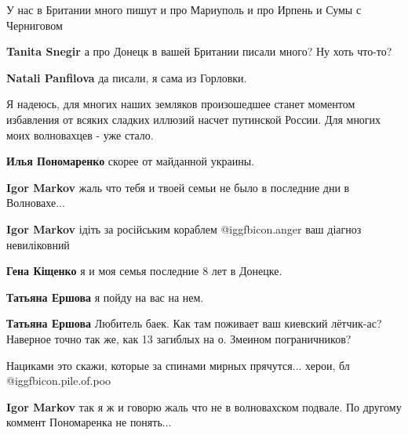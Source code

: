  
 
 
 
 
\zzSecCmt

\begin{itemize} %

У нас в Британии много пишут и про Мариуполь и про Ирпень и Сумы с Черниговом

\begin{itemize} %
\textbf{Tanita Snegir} а про Донецк в вашей Британии писали много? Ну хоть что-то?

\textbf{Natali Panfilova} да писали, я сама из Горловки.
\end{itemize} %


Я надеюсь, для многих наших земляков произошедшее станет моментом избавления от
всяких сладких иллюзий насчет путинской России. Для многих моих волновахцев -
уже стало.

\begin{itemize} %
\textbf{Илья Пономаренко} скорее от майданной украины.

\textbf{Igor Markov} жаль что тебя и твоей семьи не было в последние дни в Волновахе...

\textbf{Igor Markov} ідіть за російським кораблем @igg{fbicon.anger} 
ваш діагноз невиліковний

\textbf{Гена Кіщенко} я и моя семья последние 8 лет в Донецке.

\textbf{Татьяна Ершова} я пойду на вас на нем.

\textbf{Татьяна Ершова} Любитель баек. Как там поживает ваш киевский лётчик-ас? Наверное точно так же, как 13 загиблых на о. Змеином пограничников?

Нациками это скажи, которые за спинами мирных прячутся... херои, бл @igg{fbicon.pile.of.poo} 

\textbf{Igor Markov} так я ж и говорю жаль что не в волновахском подвале. По другому коммент Пономаренка не понять...


\end{itemize}
\end{itemize}
